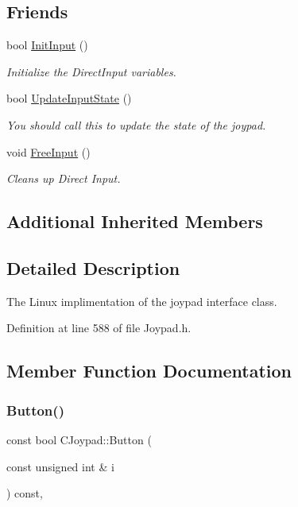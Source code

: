 \subsection*{Friends}
\begin{DoxyCompactItemize}
\item 
bool \hyperlink{class_c_joypad_ab38988ebf6ab3808447c491d4f5874e0}{Init\+Input} ()
\begin{DoxyCompactList}\small\item\em Initialize the Direct\+Input variables. \end{DoxyCompactList}\item 
bool \hyperlink{class_c_joypad_a4d5dc1be49e0a6ddee2df5035bc2b56f}{Update\+Input\+State} ()
\begin{DoxyCompactList}\small\item\em You should call this to update the state of the joypad. \end{DoxyCompactList}\item 
\mbox{\label{class_c_joypad_abdb51d74a8798e93a46d3149db9d387b}} 
void \hyperlink{class_c_joypad_abdb51d74a8798e93a46d3149db9d387b}{Free\+Input} ()
\begin{DoxyCompactList}\small\item\em Cleans up Direct Input. \end{DoxyCompactList}\end{DoxyCompactItemize}
\subsection*{Additional Inherited Members}


\subsection{Detailed Description}
The Linux implimentation of the joypad interface class. 

Definition at line 588 of file Joypad.\+h.



\subsection{Member Function Documentation}
\mbox{\label{class_c_joypad_a0125d648a2866c9524e70e3ddeb8b675}} 
\subsubsection{\texorpdfstring{Button()}{Button()}}
{\footnotesize\ttfamily const bool C\+Joypad\+::\+Button (\begin{DoxyParamCaption}\item[{const unsigned int \&}]{i }\end{DoxyParamCaption}) const\hspace{0.3cm}{\ttfamily [inline]}, {\ttfamily [virtual]}}

